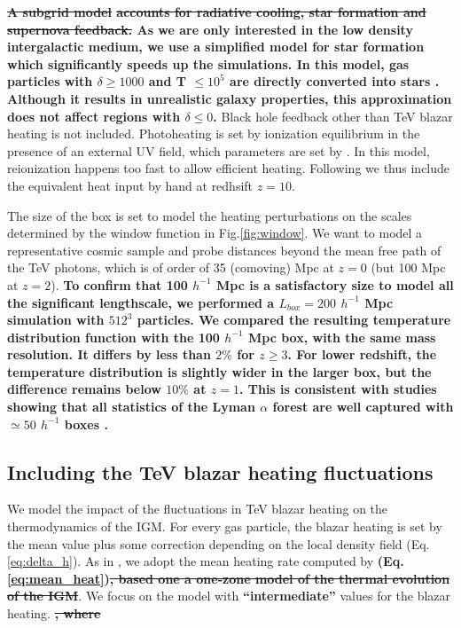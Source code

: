 \documentclass[twocolumns]{emulateapj}
\newcommand\ALc[1]{{\color{red} \bf #1}} %
\begin{document}
\ALc{\sout{A subgrid model} \citep{2003MNRAS.339..289S} \sout{accounts for radiative cooling, star formation and supernova feedback.} As we are only interested in the low density intergalactic medium, we use a simplified model for star formation which significantly speeds up the simulations. In this model, gas particles with $\delta\geq 1000$ and T $\leq 10^5$ are directly converted into stars \citep{2004MNRAS.354..684V}. Although it results in unrealistic galaxy properties, this approximation does not affect regions with $\delta \leq 0$.}  Black hole feedback other than TeV blazar heating is not included. Photoheating is set by ionization equilibrium in the presence of an external UV field, which parameters are set by \citet{2009ApJ...703.1416F}. In this model, reionization happens too fast to allow efficient heating. Following \citet{2012MNRAS.423..149P} we thus include the equivalent heat input by hand at redhsift $z=10$.


The size of the box is set to model the heating perturbations on the scales determined by the window function in Fig.\ref{fig:window}. We want to model a representative cosmic sample and probe distances beyond the mean free path of the TeV photons, which is of order of 35 (comoving) Mpc at $z=0$ (but 100 Mpc at $z=2$). \ALc{ To confirm that 100 $h^{-1}$ Mpc is a satisfactory size to model all the significant lengthscale, we performed a $L_{box}=200 $ $h^{-1}$ Mpc simulation with $512^3$ particles. We compared the resulting temperature distribution function with the 100 $h^{-1}$ Mpc box, with the same mass resolution.  It differs by less than $2\%$ for $z\geqslant 3$. For lower redshift, the temperature distribution is slightly wider in the larger box, but the difference remains below $10\%$ at $z=1$. This is consistent with studies showing that all statistics of the Lyman $\alpha$ forest are well captured with $\simeq 50$ $h^{-1}$ boxes \citep{2007MNRAS.374..196R,2009MNRAS.398L..26B}.}



\subsection{Including the TeV blazar heating fluctuations}
We model the impact of the fluctuations in TeV blazar heating on the thermodynamics of the IGM. For every gas particle, the blazar heating is set by the mean value plus some correction depending on the local density field (Eq. \ref{eq:delta_h}). As in \citet{2012MNRAS.423..149P}, we adopt the mean heating rate computed by \citet{2012ApJ...752...23C}\ALc{ (Eq. \ref{eq:mean_heat})\sout{, based one a one-zone model of the thermal evolution of the IGM}}. We focus on the model with \ALc{``intermediate''} values for the blazar heating.\ALc{\sout{, where }}
\end{document}
